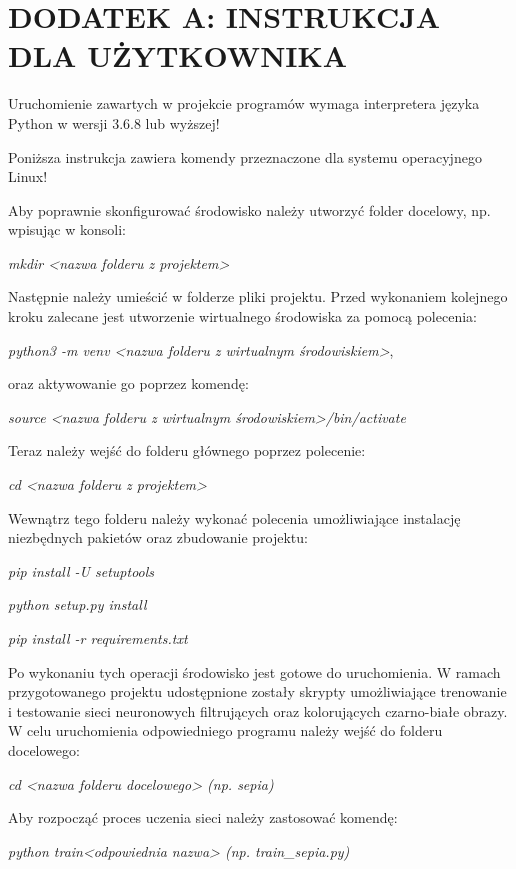 \section*{DODATEK A: INSTRUKCJA DLA UŻYTKOWNIKA}

  Uruchomienie zawartych w projekcie programów wymaga interpretera
  języka Python w wersji 3.6.8 lub wyższej!

  \noindent
  Poniższa instrukcja zawiera komendy przeznaczone dla systemu operacyjnego
  Linux!

  \noindent
  Aby poprawnie skonfigurować środowisko należy utworzyć folder docelowy, np.
  wpisując w konsoli:

  \textit{mkdir <nazwa folderu z projektem>}

  \noindent
  Następnie należy umieścić w folderze pliki projektu. Przed wykonaniem
  kolejnego kroku zalecane jest utworzenie wirtualnego środowiska za pomocą
  polecenia:

  \textit{python3 -m venv <nazwa folderu z wirtualnym środowiskiem>},

  \noindent
  oraz aktywowanie go poprzez komendę:

  \textit{source <nazwa folderu z wirtualnym środowiskiem>/bin/activate}

  \noindent
  Teraz należy wejść do folderu głównego poprzez polecenie:

  \textit{cd <nazwa folderu z projektem>}

  \noindent
  Wewnątrz tego folderu należy wykonać polecenia umożliwiające instalację niezbędnych
  pakietów oraz zbudowanie projektu:

  \textit{pip install -U setuptools}

  \textit{python setup.py install}

  \textit{pip install -r requirements.txt}

  \noindent
  Po wykonaniu tych operacji środowisko jest gotowe do uruchomienia. W ramach
  przygotowanego projektu udostępnione zostały skrypty umożliwiające trenowanie
  i testowanie sieci neuronowych filtrujących oraz kolorujących czarno-białe
  obrazy. W celu uruchomienia odpowiedniego programu należy wejść do folderu
  docelowego:

  \textit{cd <nazwa folderu docelowego> (np. sepia)}

  \noindent
  Aby rozpocząć proces uczenia sieci należy zastosować komendę:

  \textit{python train<odpowiednia nazwa> (np. train\_sepia.py)}

